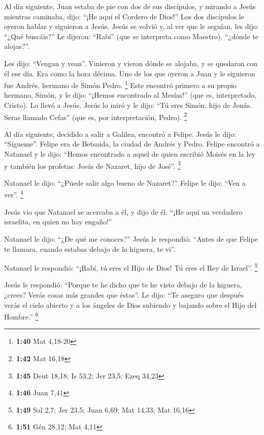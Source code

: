 \begin{paracol}{2}
 Al día siguiente, Juan estaba de pie con dos de sus
discípulos,  y mirando a Jesús mientras caminaba, dijo:
``¡He aquí el Cordero de Dios!''  Los dos discípulos le
oyeron hablar y siguieron a Jesús.  Jesús se volvió y, al
ver que le seguían, les dijo: ``¿Qué buscáis?'' Le dijeron: ``Rabí''
(que se interpreta como Maestro), ``¿dónde te alojas?''.

 Les dijo: ``Vengan y vean''. Vinieron y vieron dónde se
alojaba, y se quedaron con él ese día. Era como la hora décima.
 Uno de los que oyeron a Juan y le siguieron fue Andrés,
hermano de Simón Pedro. \footnote{\textbf{1:40} Mat 4,18-20}
 Este encontró primero a su propio hermano, Simón, y le
dijo: ``¡Hemos encontrado al Mesías!'' (que es, interpretado, Cristo).
 Lo llevó a Jesús. Jesús lo miró y le dijo: ``Tú eres
Simón, hijo de Jonás. Seras llamado Cefas'' (que es, por interpretación,
Pedro). \footnote{\textbf{1:42} Mat 16,18}

 Al día siguiente, decidido a salir a Galilea, encontró a
Felipe. Jesús le dijo: ``Sígueme''.  Felipe era de
Betsaida, la ciudad de Andrés y Pedro.  Felipe encontró a
Natanael y le dijo: ``Hemos encontrado a aquel de quien escribió Moisés
en la ley y también los profetas: Jesús de Nazaret, hijo de José''.
\footnote{\textbf{1:45} Deut 18,18; Is 53,2; Jer 23,5; Ezeq 34,23}

 Natanael le dijo: ``¿Puede salir algo bueno de
Nazaret?'' Felipe le dijo: ``Ven a ver''. \footnote{\textbf{1:46} Juan
  7,41}

 Jesús vio que Natanael se acercaba a él, y dijo de él:
``¡He aquí un verdadero israelita, en quien no hay engaño!''

 Natanael le dijo: ``¿De qué me conoces?'' Jesús le
respondió: ``Antes de que Felipe te llamara, cuando estabas debajo de la
higuera, te vi''.

 Natanael le respondió: ``¡Rabí, tú eres el Hijo de Dios!
Tú eres el Rey de Israel''. \footnote{\textbf{1:49} Sal 2,7; Jer 23,5;
  Juan 6,69; Mat 14,33; Mat 16,16}

 Jesús le respondió: ``Porque te he dicho que te he visto
debajo de la higuera, ¿crees? Verás cosas más grandes que éstas''.
 Le dijo: ``Te aseguro que después verás el cielo abierto
y a los ángeles de Dios subiendo y bajando sobre el Hijo del Hombre.''
\footnote{\textbf{1:51} Gén 28,12; Mat 4,11}


\end{paracol}
